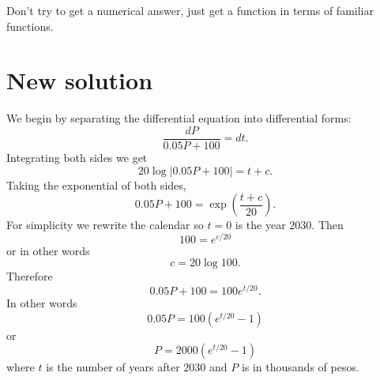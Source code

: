 \documentclass[10pt]{article}
\theoremstyle{definition}
\begin{document}
Don't try to get a numerical answer, just get a function in terms of familiar functions.

\section{New solution}
We begin by separating the differential equation into differential forms:
$$\frac{dP}{0.05P + 100} = dt.$$
Integrating both sides we get 
$$20 \log |0.05P + 100| = t + c.$$
Taking the exponential of both sides,
$$0.05P + 100 = \exp\left(\frac{t + c}{20}\right).$$
For simplicity we rewrite the calendar so $t = 0$ is the year $2030$. Then 
$$100 = e^{c/20}$$
or in other words 
$$c = 20 \log 100.$$
Therefore 
$$0.05P + 100 = 100e^{t/20}.$$
In other words 
$$0.05P = 100(e^{t/20} - 1)$$
or 
$$P = 2000(e^{t/20} - 1)$$
where $t$ is the number of years after $2030$ and $P$ is in thousands of pesos.
\end{document}

